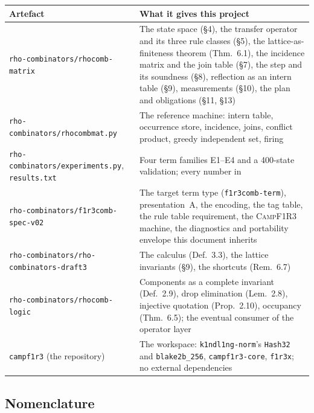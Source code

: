 \documentclass[11pt,a4paper]{article}
\newcommand{\code}[1]{\texttt{#1}}
\newcommand{\Camp}{\textsc{CampF1R3}}
\theoremstyle{definition}
\theoremstyle{plain}
\begin{document}
\begin{center}
\begin{tabularx}{\linewidth}{@{}l>{\raggedright\arraybackslash}X@{}}
\toprule
Artefact & What it gives this project\\
\midrule
\code{rho-combinators/rhocomb-matrix} & The state space (\S4), the transfer
operator and its three rule classes (\S5), the lattice-as-finiteness theorem
(Thm.~6.1), the incidence matrix and the join table (\S7), the step and its
soundness (\S8), reflection as an intern table (\S9), measurements (\S10), the
plan and obligations (\S11, \S13)\\
\code{rho-combinators/rhocombmat.py} & The reference machine: intern table,
occurrence store, incidence, joins, conflict product, greedy independent set,
firing\\
\code{rho-combinators/experiments.py}, \code{results.txt} & Four term
families E1--E4 and a 400-state validation; every number in
\cite[\S10]{matnote}\\
\code{rho-combinators/f1r3comb-spec-v02} & The target term type
(\code{f1r3comb-term}), presentation~A, the encoding, the tag table, the rule
table requirement, the \Camp{} machine, the diagnostics and portability
envelope this document inherits\\
\code{rho-combinators/rho-combinators-draft3} & The calculus
(Def.~3.3), the lattice invariants (\S9), the shortcuts (Rem.~6.7)\\
\code{rho-combinators/rhocomb-logic} & Components as a complete invariant
(Def.~2.9), drop elimination (Lem.~2.8), injective quotation (Prop.~2.10),
occupancy (Thm.~6.5); the eventual consumer of the operator layer\\
\code{campf1r3} (the repository) & The workspace: \code{k1ndl1ng-norm}'s
\code{Hash32} and \code{blake2b\_256}, \code{campf1r3-core}, \code{f1r3x};
no external dependencies\\
\bottomrule
\end{tabularx}
\end{center}

\subsection{Nomenclature}\label{sec:nomen}
\end{document}
